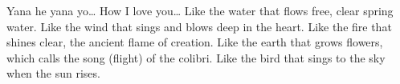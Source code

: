   \begin{translation}
    Yana he yana yo\ldots
    \nextverse
    How I love you\ldots
    \nextverse
    Like the water that flows free,
    clear spring water.
    Like the wind that sings and blows
    deep in the heart.
    \nextverse
    Like the fire that shines clear,
    the ancient flame of creation.
    Like the earth that grows flowers,
    which calls the song (flight) of the colibri.
    \nextverse
    Like the bird that sings
    to the sky when the sun rises.
  \end{translation}
\endsong


\]\]\]\]\]\]\]\]\]\]\]\]\]\]\]\]\]\]\]\]\]\]\]\]\]\]\]\]\]\]\]\]\]\]\]\]\]\]\]\]\]\]\]\]\]\]\]\]\]\]\]\]\]\]\]\]\]\]\]\]\]\]\]\]\]\]\]\]\]\]\]\]\]\]\]\]\]\]\]\]\]\]\]\]\]\]\]\]\]\]\]\]\]\]\]\]\]\]\]\]\]\]\]\]\]\]\]\]\]\]\]\]\]\]\]\]\]\]\]\]\]\]\]\]\]\]\]\]\]\]\]\]\]\]\]\]\]\]\]\]\]\]\]\]\]\]\]\]\]\]\]\]\]\]\]\]\]\]\]\]\]\]\]\]\]\]\]\]\]\]\]\]\]\]\]\]\]\]\]\]\]\]\]\]\]\]\]\]\]\]\]\]\]\]\]\]\]\]\]\]\]\]\]\]\]\]\]\]\]\]\]\]\]\]\]\]\]\]\]\]\]\]\]\]\]\]\]\]\]\]\]\]\]\]\]\]\]\]\]\]\]\]\]\]\]\]\]\]\]\]\]\]\]\]\]\]\]\]\]\]\]\]\]\]\]\]\]\]\]\]\]\]\]\]\]\]\]\]\]\]\]\]\]\]\]\]\]\]\]\]\]\]\]\]\]\]\]\]\]\]\]\]\]\]\]\]\]\]\]\]\]\]\]\]\]\]\]\]\]\]\]\]\]\]\]\]\]\]\]\]\]\]\]\]\]\]\]\]\]\]\]\]\]\]\]\]\]\]\]\]\]\]\]\]\]\]\]\]\]\]\]\]\]\]\]\]\]\]\]\]\]\]\]\]\]\]\]\]\]\]\]\]\]\]\]\]\]\]\]\]\]\]\]\]\]\]\]\]\]\]\]\]\]\]\]\]\]\]\]\]\]\]\]\]\]\]\]\]\]\]\]\]\]\]\]\]\]\]\]\]\]\]\]\]\]\]\]\]\]\]\]\]\]\]\]\]\]\]\]\]\]\]\]\]\]\]\]\]\]\]\]\]\]\]\]\]\]\]\]\]\]\]\]\]\]\]\]\]\]\]\]\]\]\]\]\]\]\]\]\]\]\]\]\]\]\]\]\]\]\]\]\]\]\]\]\]\]\]\]\]\]\]\]\]\]\]\]\]\]\]\]\]\]\]\]\]\]\]\]\]\]\]\]\]\]\]\]\]\]\]\]\]\]\]\]\]\]\]\]\]\]\]\]\]\]\]\]\]\]\]\]\]\]\]\]\]\]\]\]\]\]\]\]\]\]\]\]\]\]\]\]\]\]\]\]\]\]\]\]\]\]\]\]\]\]\]\]\]\]\]\]\]\]\]\]\]\]\]\]\]\]\]\]\]\]\]\]\]\]\]\]\]\]\]\]\]\]\]\]\]\]\]\]\]\]\]\]\]\]\]\]\]\]\]\]\]\]\]\]\]\]\]\]\]\]\]\]\]\]\]\]\]\]\]\]\]\]\]\]\]\]\]\]\]\]\]\]\]\]\]\]\]\]\]\]\]\]\]\]\]\]\]\]\]\]\]\]\]\]\]\]\]\]\]\]\]\]\]\]\]\]\]\]\]\]\]\]\]\]\]\]\]\]\]\]\]\]\]\]\]\]\]\]\]\]\]\]\]\]\]\]\]\]\]\]\]\]\]\]\]\]\]\]\]\]\]\]\]\]\]\]\]\]\]\]\]\]\]\]\]\]\]\]\]\]\]\]\]\]\]\]\]\]\]\]\]\]\]\]\]\]\]\]\]\]\]\]\]\]\]\]\]\]\]\]\]\]\]\]\]\]\]\]\]\]\]\]\]\]\]\]\]\]\]\]\]\]\]\]\]\]\]\]\]\]\]\]\]\]\]\]\]\]\]\]\]\]\]\]\]\]\]\]\]\]\]\]\]\]\]\]\]\]\]\]\]\]\]\]\]\]\]\]\]\]\]\]\]\]\]\]\]\]\]\]\]\]\]\]\]\]\]\]\]\]\]\]\]\]\]\]\]\]\]\]\]\]\]\]\]\]\]\]\]\]\]\]\]\]\]\]\]\]\]\]\]\]\]\]\]\]\]\]\]\]\]\]\]\]\]\]\]\]\]\]\]\]\]\]\]\]\]\]\]\]\]\]\]\]\]\]\]\]\]\]\]\]\]\]\]\]\]\]\]\]\]\]\]\]\]\]\]\]\]\]\]\]\]\]\]\]\]\]\]\]\]\]\]\]\]\]\]\]\]\]\]\]\]\]\]\]\]\]\]\]\]\]\]\]\]\]\]\]\]\]\]\]\]\]\]\]\]\]\]\]\]\]\]\]\]\]\]\]\]\]\]\]\]\]\]\]\]\]\]\]\]\]\]\]\]\]\]\]\]\]\]\]\]\]\]\]\]\]\]\]\]\]\]\]\]\]\]\]\]\]\]\]\]\]\]\]\]\]\]\]\]\]\]\]\]\]\]\]\]\]\]\]\]\]\]\]\]\]\]\]\]\]\]\]\]\]\]\]\]\]\]\]\]\]\]\]\]\]\]\]\]\]\]\]\]\]\]\]\]\]\]\]\]\]\]\]\]\]\]\]\]\]\]\]\]\]\]\]\]\]\]\]\]\]\]\]\]\]\]\]\]\]\]\]\]\]\]\]\]\]\]\]\]\]\]\]\]\]\]\]\]\]\]\]\]\]\]\]\]\]\]\]\]\]\]\]\]\]\]\]\]\]\]\]\]\]\]\]\]\]\]\]\]\]\]\]\]
